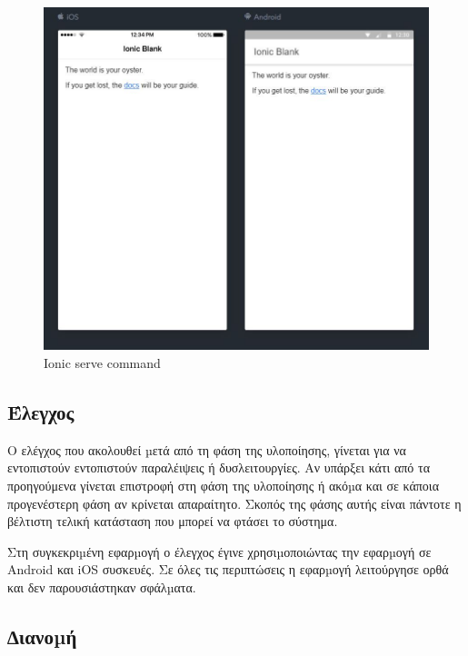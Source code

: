 \documentclass[a4paper,12pt]{article}
\begin{document}
				\begin{figure}[!htb]
					\begin{center}
						\caption{Ionic serve command}
						\vspace*{0.5cm}
						\includegraphics[width=\linewidth]{ionicServe} 
					\end{center}
				\end{figure}

		\newpage
		\subsection{Έλεγχος}

		Ο ελέγχος που ακολουθεί µετά από τη φάση της υλοποίησης, γίνεται για να εντοπιστούν
		εντοπιστούν παραλέιψεις ή δυσλειτουργίες. Αν υπάρξει κάτι από τα προηγούμενα γίνεται επιστροφή στη φάση της υλοποίησης
		ή ακόµα και σε κάποια προγενέστερη φάση αν κρίνεται απαραίτητο. Σκοπός της φάσης αυτής είναι
		πάντοτε η βέλτιστη τελική κατάσταση που μπορεί να φτάσει το σύστημα.

		Στη συγκεκριµένη εφαρµογή ο έλεγχος έγινε χρησιµοποιώντας την
		εφαρµογή σε Android και iOS συσκευές. Σε όλες τις
		περιπτώσεις η εφαρµογή λειτούργησε ορθά και δεν παρουσιάστηκαν σφάλµατα.
		
		\subsection{∆ιανοµή}
\end{document}
